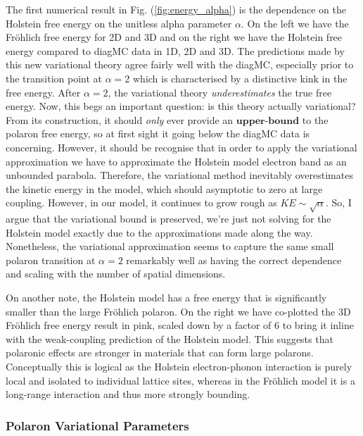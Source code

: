 The first numerical result in Fig. (\ref{fig:energy_alpha}) is the dependence on the Holstein free energy on the unitless alpha parameter $\alpha$. On the left we have the Fr\"ohlich free energy for 2D and 3D and on the right we have the Holstein free energy compared to diagMC data in 1D, 2D and 3D. The predictions made by this new variational theory agree fairly well with the diagMC, especially prior to the transition point at $\alpha = 2$ which is characterised by a distinctive kink in the free energy. After $\alpha = 2$, the variational theory \emph{underestimates} the true free energy. Now, this begs an important question: is this theory actually variational? From its construction, it should \emph{only} ever provide an $\textbf{upper-bound}$ to the polaron free energy, so at first sight it going below the diagMC data is concerning. However, it should be recognise that in order to apply the variational approximation we have to approximate the Holstein model electron band as an unbounded parabola. Therefore, the variational method inevitably overestimates the kinetic energy in the model, which should asymptotic to zero at large coupling. However, in our model, it continues to grow rough as $KE \sim \sqrt{\alpha}$. So, I argue that the variational bound is preserved, we're just not solving for the Holstein model exactly due to the approximations made along the way. Nonetheless, the variational approximation seems to capture the same small polaron transition at $\alpha = 2$ remarkably well as having the correct dependence and scaling with the number of spatial dimensions.
\newline

On another note, the Holstein model has a free energy that is significantly smaller than the large Fr\"ohlich polaron. On the right we have co-plotted the 3D Fr\"ohlich free energy result in pink, scaled down by a factor of $6$ to bring it inline with the weak-coupling prediction of the Holstein model. This suggests that polaronic effects are stronger in materials that can form large polarons. Conceptually this is logical as the Holstein electron-phonon interaction is purely local and isolated to individual lattice sites, whereas in the Fr\"ohlich model it is a long-range interaction and thus more strongly bounding.

\subsubsection{Polaron Variational Parameters}

